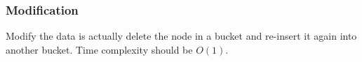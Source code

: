 \subsubsection{Modification}

Modify the data is actually delete the node in a bucket and re-insert it again into another bucket. Time complexity should be $O(1)$.

